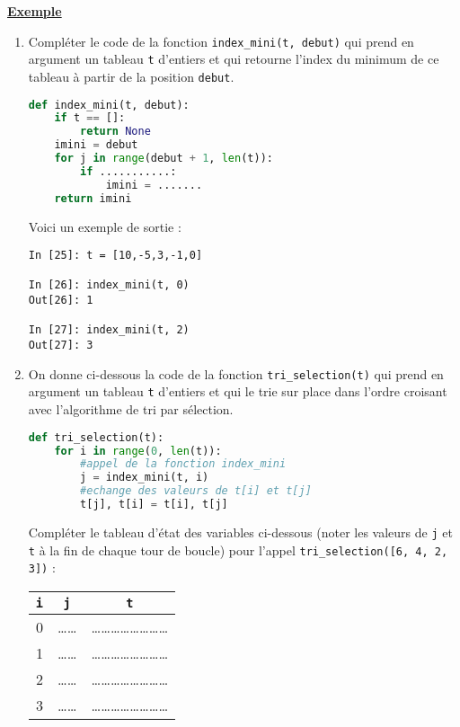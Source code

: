 \documentclass[a4paper, french, 12pt]{article}  %
\newcounter{thme}
\newcounter{def}
\newcounter{exple}
\newenvironment{exemple}[1]
{\par \medskip  \noindent \addtocounter{exple}{1} \underline{\textbf{Exemple} \textbf{\theexple} } \hspace{0.5cm}{\itshape #1} \vspace*{10pt} \par}
{\par \medskip }
\newcounter{alg}
\begin{document}
\begin{exemple}{Implémentation du tri par sélection}
\begin{enumerate}

	\item Compléter le code  de la fonction \verb+index_mini(t, debut)+ qui prend en argument un tableau \verb+t+ d'entiers et qui retourne l'index du minimum de ce tableau à partir de la position \verb+debut+.
	
\begin{lstlisting}[language=Python]
def index_mini(t, debut):   
    if t == []:
        return None
    imini = debut
    for j in range(debut + 1, len(t)):
        if ...........:
            imini = .......
    return imini 
\end{lstlisting}
	
Voici un exemple de sortie :

\begin{lstlisting}
In [25]: t = [10,-5,3,-1,0]

In [26]: index_mini(t, 0)
Out[26]: 1

In [27]: index_mini(t, 2)
Out[27]: 3
\end{lstlisting}

\item On donne ci-dessous la code  de la fonction \verb+tri_selection(t)+ qui prend en argument un tableau   \verb+t+ d'entiers et qui le trie  sur place dans l'ordre croisant avec l'algorithme de tri par sélection.
	
	\begin{lstlisting}[language=Python]
def tri_selection(t):    
    for i in range(0, len(t)):
        #appel de la fonction index_mini
        j = index_mini(t, i)
        #echange des valeurs de t[i] et t[j]
        t[j], t[i] = t[i], t[j]        
\end{lstlisting}

Compléter le tableau d'état des variables ci-dessous (noter les valeurs de \verb+j+ et \verb+t+ à la fin de chaque tour de boucle)  pour l'appel \verb+tri_selection([6, 4, 2, 3])+ :
	
	
	\begin{center}
	
	\renewcommand{\arraystretch}{2}
		\begin{tabular}{|c|c|c|}
		\hline 
		\verb+i+ & \verb+j+ & \verb+t+ \\ 
		\hline 
		0 & \ldots \ldots  & \ldots \ldots  \ldots \ldots \ldots \ldots  \ldots \ldots\\ 
		\hline 
		1 &  \ldots \ldots  & \ldots \ldots  \ldots \ldots \ldots \ldots  \ldots \ldots\\ 
		\hline 
		2 &  \ldots \ldots  & \ldots \ldots  \ldots \ldots \ldots \ldots  \ldots \ldots \\ 
		\hline 
		3 &  \ldots \ldots  & \ldots \ldots  \ldots \ldots  \ldots \ldots  \ldots \ldots\\ 
		\hline 
		\end{tabular} 
	

\end{center}
\end{enumerate}
\end{exemple}
\end{document}
